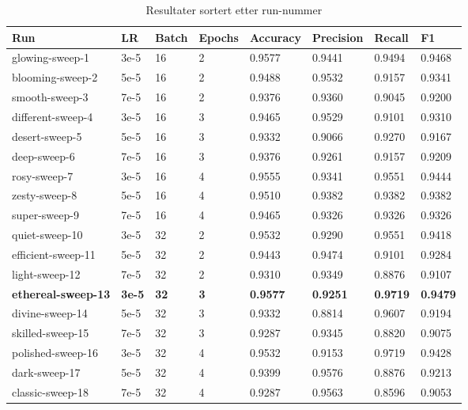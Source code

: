 \begin{table}
\caption{Resultater sortert etter run-nummer}
\label{tab:results}
\begin{tabular}{llllllll}
\toprule
Run & LR & Batch & Epochs & Accuracy & Precision & Recall & F1 \\
\midrule
glowing-sweep-1 & 3e-5 & 16 & 2 & 0.9577 & 0.9441 & 0.9494 & 0.9468 \\
blooming-sweep-2 & 5e-5 & 16 & 2 & 0.9488 & 0.9532 & 0.9157 & 0.9341 \\
smooth-sweep-3 & 7e-5 & 16 & 2 & 0.9376 & 0.9360 & 0.9045 & 0.9200 \\
different-sweep-4 & 3e-5 & 16 & 3 & 0.9465 & 0.9529 & 0.9101 & 0.9310 \\
desert-sweep-5 & 5e-5 & 16 & 3 & 0.9332 & 0.9066 & 0.9270 & 0.9167 \\
deep-sweep-6 & 7e-5 & 16 & 3 & 0.9376 & 0.9261 & 0.9157 & 0.9209 \\
rosy-sweep-7 & 3e-5 & 16 & 4 & 0.9555 & 0.9341 & 0.9551 & 0.9444 \\
zesty-sweep-8 & 5e-5 & 16 & 4 & 0.9510 & 0.9382 & 0.9382 & 0.9382 \\
super-sweep-9 & 7e-5 & 16 & 4 & 0.9465 & 0.9326 & 0.9326 & 0.9326 \\
quiet-sweep-10 & 3e-5 & 32 & 2 & 0.9532 & 0.9290 & 0.9551 & 0.9418 \\
efficient-sweep-11 & 5e-5 & 32 & 2 & 0.9443 & 0.9474 & 0.9101 & 0.9284 \\
light-sweep-12 & 7e-5 & 32 & 2 & 0.9310 & 0.9349 & 0.8876 & 0.9107 \\
\textbf{ethereal-sweep-13} & \textbf{3e-5} & \textbf{32} & \textbf{3} & \textbf{0.9577} & \textbf{0.9251} & \textbf{0.9719} & \textbf{0.9479} \\
divine-sweep-14 & 5e-5 & 32 & 3 & 0.9332 & 0.8814 & 0.9607 & 0.9194 \\
skilled-sweep-15 & 7e-5 & 32 & 3 & 0.9287 & 0.9345 & 0.8820 & 0.9075 \\
polished-sweep-16 & 3e-5 & 32 & 4 & 0.9532 & 0.9153 & 0.9719 & 0.9428 \\
dark-sweep-17 & 5e-5 & 32 & 4 & 0.9399 & 0.9576 & 0.8876 & 0.9213 \\
classic-sweep-18 & 7e-5 & 32 & 4 & 0.9287 & 0.9563 & 0.8596 & 0.9053 \\
\bottomrule
\end{tabular}
\end{table}
